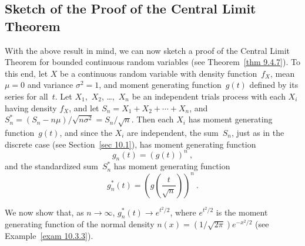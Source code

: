 \subsection*{Sketch of the Proof of the Central Limit Theorem}
With the above result in mind, we can now sketch a proof of the Central Limit Theorem
for bounded continuous random variables (see Theorem~\ref{thm 9.4.7}).  To this end,
let $X$ be a continuous random variable with density function~$f_X$, mean $\mu
= 0$ and variance $\sigma^2 = 1$, and moment generating function~$g(t)$ defined
by its series for all~$t$.  Let $X_1$,~$X_2$, \ldots,~$X_n$ be an independent
trials process with each $X_i$ having density $f_X$, and let $S_n = X_1 + X_2
+\cdots+ X_n$, and $S_n^* = (S_n - n\mu)/\sqrt{n\sigma^2} = S_n/\sqrt n$.  Then
each $X_i$ has moment generating function~$g(t)$, and since the $X_i$ are
independent, the sum~$S_n$, just as in the discrete case (see Section~\ref{sec 10.1}),
has moment generating function
$$
g_n(t) = (g(t))^n\ ,
$$
and the standardized sum~$S_n^*$ has moment generating function
$$
g_n^*(t) = \left(g\left(\frac t{\sqrt n}\right)\right)^n\ .
$$

We now show that, as $n \to \infty$, $g_n^*(t) \to e^{t^2/2}$, where
$e^{t^2/2}$ is the moment generating function of the normal density $n(x) =
(1/\sqrt{2\pi}) e^{-x^2/2}$ (see Example~\ref{exam 10.3.3}).

